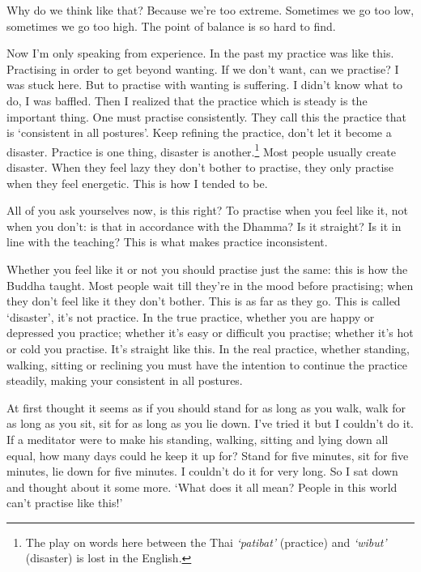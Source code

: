 Why do we think like that? Because we're too extreme. Sometimes we go too low, sometimes we go too high. The point of balance is so hard to find. 

Now I'm only speaking from experience. In the past my practice was like this. Practising in order to get beyond wanting. If we don't want, can we practise? I was stuck here. But to practise with wanting is suffering. I didn't know what to do, I was baffled. Then I realized that the practice which is steady is the important thing. One must practise consistently. They call this the practice that is `consistent in all postures'. Keep refining the practice, don't let it become a disaster. Practice is one thing, disaster is another.\footnote{The play on words here between the Thai \textit{`patibat'} (practice) and \textit{`wibut'} (disaster) is lost in the English.} Most people usually create disaster. When they feel lazy they don't bother to practise, they only practise when they feel energetic. This is how I tended to be. 

All of you ask yourselves now, is this right? To practise when you feel like it, not when you don't: is that in accordance with the Dhamma? Is it straight? Is it in line with the teaching? This is what makes practice inconsistent. 

Whether you feel like it or not you should practise just the same: this is how the Buddha taught. Most people wait till they're in the mood before practising; when they don't feel like it they don't bother. This is as far as they go. This is called `disaster', it's not practice. In the true practice, whether you are happy or depressed you practice; whether it's easy or difficult you practise; whether it's hot or cold you practise. It's straight like this. In the real practice, whether standing, walking, sitting or reclining you must have the intention to continue the practice steadily, making your  consistent in all postures. 

At first thought it seems as if you should stand for as long as you walk, walk for as long as you sit, sit for as long as you lie down. I've tried it but I couldn't do it. If a meditator were to make his standing, walking, sitting and lying down all equal, how many days could he keep it up for? Stand for five minutes, sit for five minutes, lie down for five minutes. I couldn't do it for very long. So I sat down and thought about it some more. `What does it all mean? People in this world can't practise like this!' 

